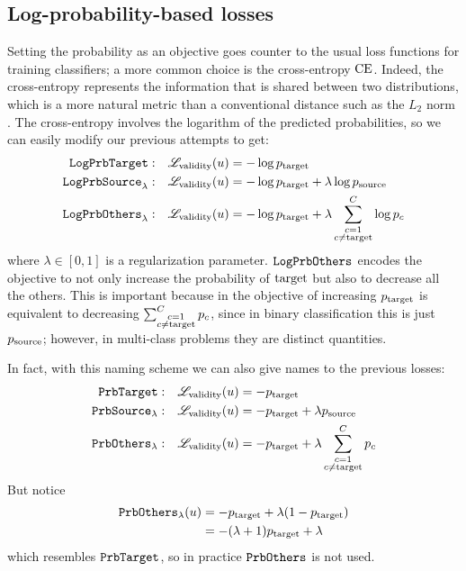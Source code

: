 \documentclass[../main.tex]{subfiles}
\begin{document}
\subsection{Log-probability-based losses}

Setting the probability as an objective goes counter to the usual loss functions for training classifiers; a more common choice is the cross-entropy $\text{CE}$.
Indeed, the cross-entropy represents the information that is shared between two distributions, which is a more natural metric than a conventional distance such as the $L_2$ norm \cite{murphyMachine2012}.
The cross-entropy involves the logarithm of the predicted probabilities, so we can easily modify our previous attempts to get:
\begin{align*}
    \mathtt{LogPrbTarget}{}:        & \quad    \mathscr{L}_\text{validity}(u) = - \log p_{\mathrm{target}}                              \\
    \mathtt{LogPrbSource}_{\lambda}: & \quad     \mathscr{L}_\text{validity}(u) = - \log p_{\mathrm{target}} + \lambda \log p_{\mathrm{source}}    \\
    \mathtt{LogPrbOthers}_{\lambda}: & \quad    \mathscr{L}_\text{validity}(u) = - \log p_{\mathrm{target}} + \lambda \sum_{\substack{{c}=1 \\ {c} \neq \mathrm{target}}}^C \log p_c
\end{align*}
where $\lambda \in [0, 1]$ is a regularization parameter.
$\mathtt{LogPrbOthers}_{}$ encodes the objective to not only increase the probability of $\mathrm{target}$ but also to decrease all the others.
This is important because in \ls{} the objective of increasing $p_{\mathrm{target}}$ is equivalent to decreasing $\sum_{\substack{{c}=1 \\ {c} \neq \mathrm{target}}}^C p_c$, since in binary classification this is just $p_{\mathrm{source}}$; however, in multi-class problems they are distinct quantities.

In fact, with this naming scheme we can also give names to the previous losses:
\begin{align*}
    \mathtt{PrbTarget}{}:        & \quad    \mathscr{L}_\text{validity}(u) = - p_{\mathrm{target}}                         \\
    \mathtt{PrbSource}_{\lambda}: & \quad     \mathscr{L}_\text{validity}(u) = - p_{\mathrm{target}} + \lambda p_{\mathrm{source}}    \\
    \mathtt{PrbOthers}_{\lambda}: & \quad    \mathscr{L}_\text{validity}(u) = - p_{\mathrm{target}} + \lambda \sum_{\substack{{c}=1 \\ {c} \neq \mathrm{target}}}^C p_c
\end{align*}
But notice
\begin{align*}
    \mathtt{PrbOthers}_{\lambda}(u)
     & = - p_{\mathrm{target}} + \lambda (1 - p_{\mathrm{target}}) \\
     & = -(\lambda + 1)p_{\mathrm{target}} + \lambda
\end{align*}
which resembles $\mathtt{PrbTarget}{}$, so in practice $\mathtt{PrbOthers}_{}$ is not used.
\end{document}

